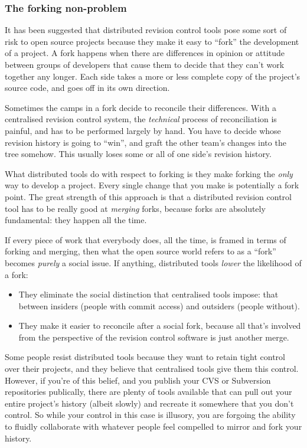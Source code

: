 \subsubsection{The forking non-problem}

It has been suggested that distributed revision control tools pose
some sort of risk to open source projects because they make it easy to
``fork'' the development of a project.  A fork happens when there are
differences in opinion or attitude between groups of developers that
cause them to decide that they can't work together any longer.  Each
side takes a more or less complete copy of the project's source code,
and goes off in its own direction.

Sometimes the camps in a fork decide to reconcile their differences.
With a centralised revision control system, the \emph{technical}
process of reconciliation is painful, and has to be performed largely
by hand.  You have to decide whose revision history is going to
``win'', and graft the other team's changes into the tree somehow.
This usually loses some or all of one side's revision history.

What distributed tools do with respect to forking is they make forking
the \emph{only} way to develop a project.  Every single change that
you make is potentially a fork point.  The great strength of this
approach is that a distributed revision control tool has to be really
good at \emph{merging} forks, because forks are absolutely
fundamental: they happen all the time.  

If every piece of work that everybody does, all the time, is framed in
terms of forking and merging, then what the open source world refers
to as a ``fork'' becomes \emph{purely} a social issue.  If anything,
distributed tools \emph{lower} the likelihood of a fork:
\begin{itemize}
\item They eliminate the social distinction that centralised tools
  impose: that between insiders (people with commit access) and
  outsiders (people without).
\item They make it easier to reconcile after a social fork, because
  all that's involved from the perspective of the revision control
  software is just another merge.
\end{itemize}

Some people resist distributed tools because they want to retain tight
control over their projects, and they believe that centralised tools
give them this control.  However, if you're of this belief, and you
publish your CVS or Subversion repositories publically, there are
plenty of tools available that can pull out your entire project's
history (albeit slowly) and recreate it somewhere that you don't
control.  So while your control in this case is illusory, you are
forgoing the ability to fluidly collaborate with whatever people feel
compelled to mirror and fork your history.

